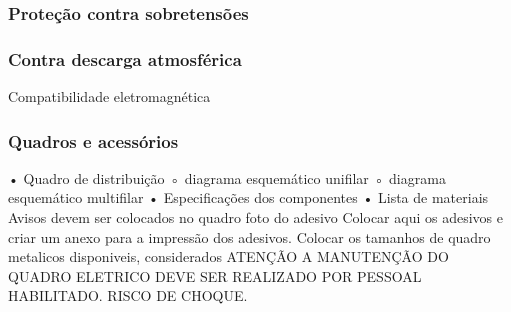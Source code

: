 \subsubsection{ Proteção contra sobretensões}

\subsubsection{ Contra descarga atmosférica}

	Compatibilidade eletromagnética
\subsubsection{Quadros e acessórios}

    • Quadro de distribuição
        ◦ diagrama esquemático unifilar
        ◦ diagrama esquemático multifilar
    • Especificações dos componentes
    • Lista de materiais
Avisos devem ser colocados no quadro
foto do adesivo
Colocar aqui os adesivos e criar um anexo para a impressão dos adesivos.
Colocar os tamanhos de quadro metalicos disponiveis, considerados
ATENÇÃO A MANUTENÇÃO DO QUADRO ELETRICO DEVE SER REALIZADO POR PESSOAL HABILITADO. RISCO DE CHOQUE.